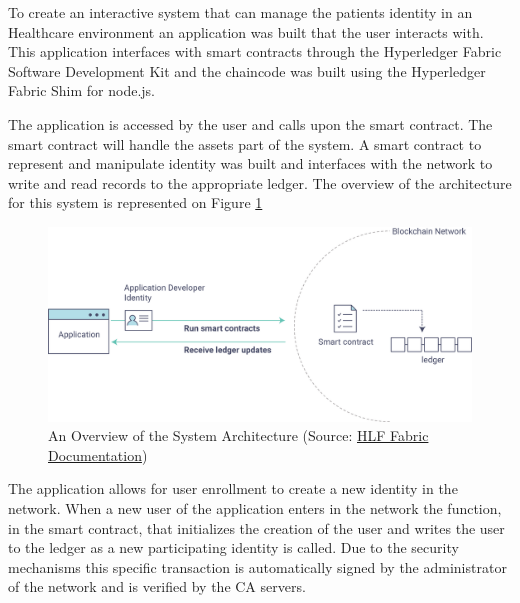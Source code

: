\documentclass[]{llncs}
\begin{document}
To create an interactive system that can manage the patients identity in an Healthcare environment 
an application was built that the user interacts with. 
This application interfaces with smart contracts through the Hyperledger Fabric Software Development Kit
and the chaincode was built using the Hyperledger Fabric Shim for node.js.

The application is accessed by the user and calls upon the smart contract. 
The smart contract will handle the assets part of the system.
A smart contract to represent and manipulate identity was built and interfaces with the network 
to write and read records to the appropriate ledger. The overview of the architecture for this system is
represented on Figure \ref{fig:appOverview}

\begin{figure}[ht]
\centering
\includegraphics[width=1\linewidth]{images/hyperledgerAppOverview.png}
\caption{\label{fig:appOverview}An Overview of the System Architecture (Source: \href{http://hyperledger-fabric.readthedocs.io/en/latest/write_first_app.html}{HLF Fabric Documentation})}
\end{figure}

The application allows for user enrollment to create a new identity in the network.
When a new user of the application enters in the network the function, in the smart contract, 
that initializes the creation of the user and writes the user to the ledger as a new participating 
identity is called. Due to the security mechanisms this specific transaction is automatically signed by the
administrator of the network and is verified by the CA servers.
\end{document}
